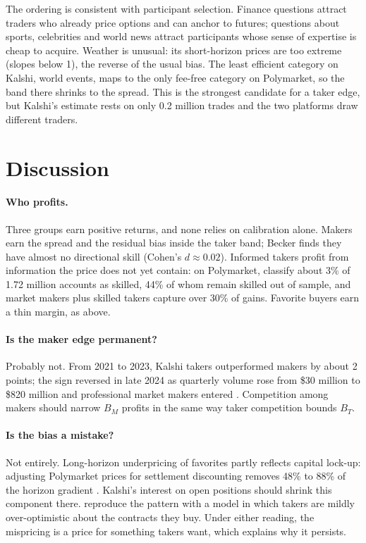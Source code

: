 \documentclass[11pt]{article}
\begin{document}
The ordering is consistent with participant selection. Finance questions attract traders who already price options and can anchor to futures; questions about sports, celebrities and world news attract participants whose sense of expertise is cheap to acquire. Weather is unusual: its short-horizon prices are too extreme (slopes below 1), the reverse of the usual bias. The least efficient category on Kalshi, world events, maps to the only fee-free category on Polymarket, so the band there shrinks to the spread. This is the strongest candidate for a taker edge, but Kalshi's estimate rests on only 0.2 million trades and the two platforms draw different traders.

\section{Discussion}

\paragraph{Who profits.} Three groups earn positive returns, and none relies on calibration alone. Makers earn the spread and the residual bias inside the taker band; Becker finds they have almost no directional skill (Cohen's $d \approx 0.02$). Informed takers profit from information the price does not yet contain: on Polymarket, \citet{gomezcram2026} classify about 3\% of 1.72 million accounts as skilled, 44\% of whom remain skilled out of sample, and market makers plus skilled takers capture over 30\% of gains. Favorite buyers earn a thin margin, as above.

\paragraph{Is the maker edge permanent?} Probably not. From 2021 to 2023, Kalshi takers outperformed makers by about 2 points; the sign reversed in late 2024 as quarterly volume rose from \$30 million to \$820 million and professional market makers entered \citep{becker2026}. Competition among makers should narrow $B_M$ profits in the same way taker competition bounds $B_T$.

\paragraph{Is the bias a mistake?} Not entirely. Long-horizon underpricing of favorites partly reflects capital lock-up: adjusting Polymarket prices for settlement discounting removes 48\% to 88\% of the horizon gradient \citep{gebele2026}. Kalshi's interest on open positions should shrink this component there. \citet{burgi2026} reproduce the pattern with a model in which takers are mildly over-optimistic about the contracts they buy. Under either reading, the mispricing is a price for something takers want, which explains why it persists.
\end{document}

